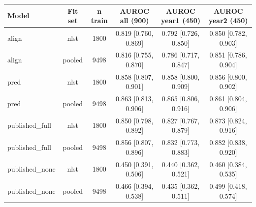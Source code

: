 \begin{tabular}{lccccc}
\toprule
Model & Fit set & n train & AUROC all (900) & AUROC year1 (450) & AUROC year2 (450) \\
\midrule
align & nlst & 1800 & 0.819 [0.760, 0.869] & 0.792 [0.726, 0.850] & 0.850 [0.782, 0.903] \\
align & pooled & 9498 & 0.816 [0.755, 0.870] & 0.786 [0.717, 0.847] & 0.851 [0.786, 0.904] \\
pred & nlst & 1800 & 0.858 [0.807, 0.901] & 0.858 [0.800, 0.909] & 0.856 [0.800, 0.902] \\
pred & pooled & 9498 & 0.863 [0.813, 0.906] & 0.865 [0.806, 0.916] & 0.861 [0.804, 0.906] \\
published_full & nlst & 1800 & 0.850 [0.798, 0.892] & 0.827 [0.767, 0.879] & 0.873 [0.824, 0.916] \\
published_full & pooled & 9498 & 0.856 [0.807, 0.896] & 0.832 [0.773, 0.883] & 0.882 [0.838, 0.920] \\
published_none & nlst & 1800 & 0.450 [0.391, 0.506] & 0.440 [0.362, 0.521] & 0.460 [0.384, 0.535] \\
published_none & pooled & 9498 & 0.466 [0.394, 0.538] & 0.435 [0.362, 0.511] & 0.499 [0.418, 0.574] \\
\bottomrule
\end{tabular}
